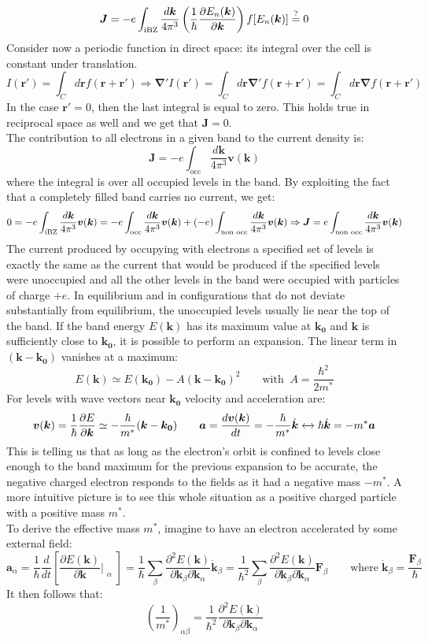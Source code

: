 \documentclass[10.75pt,a4paper,openright,bottom=2cm]{article}
\renewcommand{\Vec}[1]{\boldsymbol{#1}}
\newcommand{\RN}[1]{%
  \textup{\uppercase\expandafter{\romannumeral#1}}%
}
\begin{document}
\[
\Vec{J}=-e\int_{\text{\RN{1}BZ}}\frac{d\Vec{k}}{4\pi^3}\left(\frac{1}{\hbar}\frac{\partial E_n(\Vec{k})}{\partial\Vec{k}}\right)f[E_n(\Vec{k})]\stackrel{?}{=}0
\]
Consider now a periodic function in direct space: its integral over the cell is constant under translation.
\[
I(\Vec{r'})=\int_Cd\Vec{r}f(\Vec{r}+\Vec{r'})\Rightarrow\Vec{\nabla'}I(\Vec{r'})=\int_Cd\Vec{r}\Vec{\nabla'}f(\Vec{r}+\Vec{r'})=\int_Cd\Vec{r}\Vec{\nabla}f(\Vec{r}+\Vec{r'})
\]
In the case $\Vec{r'}=0$, then the last integral is equal to zero. This holds true in reciprocal space as well and we get that $\Vec{J}=0$.\\
The contribution to all electrons in a given band to the current density is:
\[
\Vec{J}=-e\int_{\text{occ}}\frac{d\Vec{k}}{4\pi^3}\Vec{v}(\Vec{k})
\]
where the integral is over all occupied levels in the band. By exploiting the fact that a completely filled band carries no current, we get:
\[
0=-e\int_{\text{\RN{1}BZ}}\frac{d\Vec{k}}{4\pi^3}\Vec{v}(\Vec{k})=-e\int_{\text{occ}}\frac{d\Vec{k}}{4\pi^3}\Vec{v}(\Vec{k})+(-e)\int_{\text{non occ}}\frac{d\Vec{k}}{4\pi^3}\Vec{v}(\Vec{k})\Rightarrow\Vec{J}=e\int_{\text{non occ}}\frac{d\Vec{k}}{4\pi^3}\Vec{v}(\Vec{k})
\]
The current produced by occupying with electrons a specified set of levels is exactly the same as the current that would be produced if the specified levels were unoccupied and all the other levels in the band were occupied with particles of charge $+e$. In equilibrium and in configurations that do not deviate substantially from equilibrium, the unoccupied levels usually lie near the top of the band. If the band energy $E(\Vec{k})$ has its maximum value at $\Vec{k_0}$ and $\Vec{k}$ is sufficiently close to $\Vec{k_0}$, it is possible to perform an expansion. The linear term in $(\Vec{k}-\Vec{k_0})$ vanishes at a maximum:
\[
E(\Vec{k})\simeq E(\Vec{k_0})-A(\Vec{k}-\Vec{k_0})^2 \qquad\text{with}\;\; A=\frac{\hbar^2}{2m^*}
\]
For levels with wave vectors near $\Vec{k_0}$ velocity and acceleration are:
\[
\Vec{v}(\Vec{k})=\frac{1}{\hbar}\frac{\partial E}{\partial\Vec{k}}\simeq-\frac{\hbar}{m^*}(\Vec{k}-\Vec{k_0}) \qquad \Vec{a}=\frac{d\Vec{v}(\Vec{k})}{dt}=-\frac{\hbar}{m^*}\Dot{\Vec{k}}\xleftrightarrow[]{}\hbar\Dot{\Vec{k}}=-m^*\Vec{a}
\]
This is telling us that as long as the electron's orbit is confined to levels close enough to the band maximum for the previous expansion to be accurate, the negative charged electron responds to the fields as it had a negative mass $-m^*$. A more intuitive picture is to see this whole situation as a positive charged particle with a positive mass $m^*$.\\
To derive the effective mass $m^*$, imagine to have an electron accelerated by some external field:
\[
\Vec{a}_\alpha=\frac{1}{\hbar}\frac{d}{dt}\left[\frac{\partial E(\Vec{k})}{\partial\Vec{k}}\Bigr|_{\substack{\alpha}}\right]=\frac{1}{\hbar}\sum_\beta\frac{\partial^2E(\Vec{k})}{\partial\Vec{k}_\beta\partial\Vec{k}_\alpha}\Dot{\Vec{k}}_\beta=\frac{1}{\hbar^2}\sum_\beta\frac{\partial^2E(\Vec{k})}{\partial\Vec{k}_\beta\partial\Vec{k}_\alpha}\Vec{F}_\beta \qquad \text{where}\;\Dot{\Vec{k}}_\beta=\frac{\Vec{F}_\beta}{\hbar}
\]
It then follows that:
\[
\left(\frac{1}{m^*}\right)_{\alpha\beta}=\frac{1}{\hbar^2}\frac{\partial^2E(\Vec{k})}{\partial\Vec{k}_\beta\partial\Vec{k}_\alpha}
\]
\end{document}
